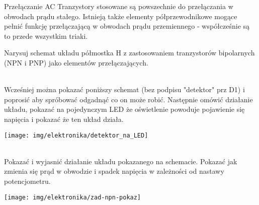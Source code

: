 \documentclass{pdfBooklets}
\begin{document}
\begin{ProTip}{Przełączanie AC}
Tranzystory stosowane są powszechnie do przełączania w obwodach prądu stałego. Istnieją także elementy półprzewodnikowe mogące pełnić funkcję przełączającą w obwodach prądu przemiennego - współcześnie są to przede wszystkim triaki.
\end{ProTip}

\begin{Zadanie}{}{}
Narysuj schemat układu półmostka H z zastosowaniem tranzystorów bipolarnych (NPN i PNP) jako elementów przełączających.
\end{Zadanie}

\begin{teacherOnly}
\noindent\begin{minipage}[t]{0.6\textwidth}
\\
Wcześniej można pokazać poniższy schemat (bez podpisu "detektor" prz D1) i poprosić aby spróbować odgadnąć co on może robić.
Następnie omówić działanie układu, pokazać na pojedynczym LED że oświetlenie powoduje pojawienie się napięcia i pokazać że ten układ działa.
\end{minipage}
\hfill
\begin{minipage}[t]{0.35\textwidth}
\vspace{-10pt}
\texttt{[image: img/elektronika/detektor\_na\_LED]}
\end{minipage}

\noindent\begin{minipage}[t]{0.6\textwidth}
\\
Pokazać i wyjasnić działanie układu pokazanego na schemacie. Pokazać jak zmienia się prąd w obwodzie i spadek napięcia w zależności od nastawy potencjometru.

\end{minipage}
\hfill
\begin{minipage}[t]{0.35\textwidth}
\vspace{-10pt}
\texttt{[image: img/elektronika/zad-npn-pokaz]}
\end{minipage}
\end{teacherOnly}
\end{document}
